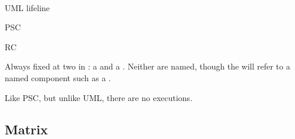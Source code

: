 \paragraph{\mactor}
\begin{featset}
\item[UML] lifeline
\item[PSC] 
\item[RC] 
\end{featset}

Always fixed at two  in \langname: a \mtarget{} and a \mworld{}.
Neither are named, though the \mtarget{} will refer to a
named component such as a \mrcmodule.

Like PSC, but unlike UML, there are no executions.

\subsection{Matrix}

\newcommand\rot{\rotatebox{90}}
\newcommand\matding[1]{{\small#1}}
\newcommand\OK{\matding{\checkmark}}
\newcommand\ISH{\matding{(\OK)}}
\newcommand\NO{\matding{\(\bullet\)}}
\newcommand\SOON{\matding{\(\circ\)}}
\newcommand\NA{\matding{n/a}}


